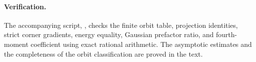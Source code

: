 \documentclass[11pt]{article}
\theoremstyle{remark}
\begin{document}
\paragraph{Verification.}
The accompanying script, , checks the finite orbit table,
projection identities, strict corner gradients, energy equality,
Gaussian prefactor ratio, and fourth-moment coefficient using exact
rational arithmetic. The asymptotic estimates and the completeness
of the orbit classification are proved in the text.
\end{document}
